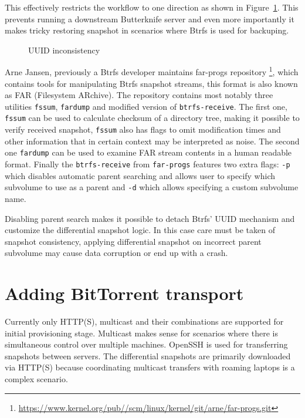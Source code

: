 \documentclass[a4paper,11pt]{kth-mag}
\begin{document}
This effectively restricts the workflow to one direction
as shown in Figure~\ref{fig:btrfs-received-uuid-issue}.
This prevents running a downstream Butterknife server and
even more importantly it makes tricky restoring snapshot
in scenarios where Btrfs is used for backuping.


\begin{figure}[!htb]
\centering
\scalebox{0.5}{}
\caption{UUID inconsistency}
\label{fig:btrfs-received-uuid-issue}
\end{figure}

Arne Jansen, previously a Btrfs developer maintains far-progs repository
\footnote{\url{https://www.kernel.org/pub//scm/linux/kernel/git/arne/far-progs.git}},
which contains tools for manipulating Btrfs snapshot streams,
this format is also known as FAR (Filesystem ARchive).
The repository contains most notably three utilities
\texttt{fssum}, \texttt{fardump} and modified version of \texttt{btrfs-receive}.
The first one, \texttt{fssum} can be used to calculate checksum of a
directory tree, making it possible to verify received snapshot,
\texttt{fssum} also has flags to omit modification times and other information that 
in certain context may be interpreted as noise.
The second one \texttt{fardump} can be used to examine FAR stream contents
in a human readable format.
Finally the \texttt{btrfs-receive} from \texttt{far-progs} features
two extra flags: \texttt{-p} which disables
automatic parent searching and allows user to specify which 
subvolume to use as a parent and \texttt{-d} which 
allows specifying a custom subvolume name.

Disabling parent search makes it possible to detach
Btrfs' UUID mechanism and customize the differential snapshot logic.
In this case care must be taken of snapshot consistency,
applying differential snapshot on incorrect parent subvolume
may cause data corruption or end up with a crash.

\section{Adding BitTorrent transport}

Currently only HTTP(S), multicast and their combinations are supported
for initial provisioning stage.
Multicast makes sense for scenarios where there is simultaneous
control over multiple machines.
OpenSSH is used for transferring snapshots between servers.
The differential snapshots are primarily downloaded
via HTTP(S) because coordinating multicast
transfers with roaming laptops is a complex scenario.
\end{document}
